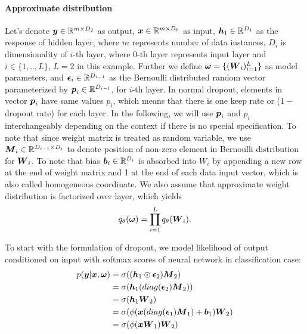 \paragraph{Approximate distribution}
Let's denote $\boldsymbol y\in \mathbb R ^{m \times D_{2}}$ as output, $\boldsymbol x \in \mathbb R^{m \times D_{0}}$ as input, $\boldsymbol h_{1} \in \mathbb R^{D_{1}}$ as the response of hidden layer, where $m$ represents number of data instances, $D_{i}$ is dimensionality of $i$-th layer, where $0$-th layer represents input layer and $i \in \{1,..,L\}$, $L=2$ in this example. Further we define $\boldsymbol \omega = \{ (\boldsymbol W_{i})_{i=1}^{L}  \}$ as model parameters, and $\boldsymbol \epsilon_{i} \in \mathbb R^{D_{i-1}}$ as the Bernoulli distributed random vector parameterized by $\boldsymbol p_{i} \in \mathbb R^{D_{i-1}}$, for $i$-th layer. In normal dropout, elements in vector $\boldsymbol p_{i}$ have same values $p_{i}$, which means that there is one keep rate or ($1-$dropout rate) for each layer. In the following, we will use $\boldsymbol p_{i}$ and $p_{i}$ interchangeably depending on the context if there is no special specification. To note that since weight matrix is treated as random variable, we use $\boldsymbol M_{i} \in \mathbb R^{D_{i-1} \times D_{i}}$ to denote position of non-zero element in Bernoulli distribution for $\boldsymbol W_{i}$. To note that bias $\boldsymbol b_{i} \in \mathbb R^{D_{i}}$ is absorbed into $W_{i}$ by appending a new row at the end of weight matrix and 1 at the end of each data input vector, which is also called homogeneous coordinate. We also assume that approximate weight distribution is factorized over layer, which yields
\[
q_{\theta}(\boldsymbol \omega) = \prod_{i=1}^{L}q_{\theta}(\boldsymbol W_{i}). 
\]

To start with the formulation of dropout, we model likelihood of output conditioned on input with softmax scores of neural network in classification case:
\begin{equation}
	\begin{aligned} \label{dropout_form}
	p(\boldsymbol y| \boldsymbol x, \boldsymbol \omega) & = \sigma((\boldsymbol h_{1} \odot \boldsymbol \epsilon_{2}) \boldsymbol M_{2})\\
		   & = \sigma(\boldsymbol h_{1} (diag(\boldsymbol \epsilon_{2}) \boldsymbol M_{2})) \\
		   & = \sigma(\boldsymbol h_{1} \boldsymbol W_{2}) \\
		   & = \sigma(\phi(\boldsymbol x (diag(\boldsymbol \epsilon_{1}) \boldsymbol M_{1})+ \boldsymbol b_{1}) \boldsymbol W_{2}) \\
		   & = \sigma(\phi(\boldsymbol x \boldsymbol W_{1})\boldsymbol W_{2})
	\end{aligned}
\end{equation}


